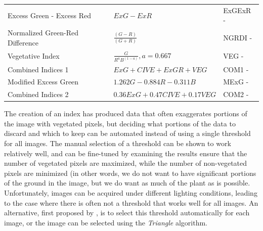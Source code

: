 \documentclass[letterpaper]{article}
\begin{document}
{{\begin{longtable}{x{\dimexpr.25\tabcolsep}
                  x{\dimexpr.35\tabcolsep}
                  x{\dimexpr.4\tabcolsep}}
			Excess Green - Excess Red   
			& $ExG - ExR$ 
			& ExGExR - \parencite{Neto2004-od}
	\tabularnewline\addlinespace
	
			Normalized Green-Red Difference    
			& $\frac {(G - R)} {(G + R)}$ 
			& NGRDI - \parencite{Hunt2005-tz}
	\tabularnewline\addlinespace
	
			Vegetative Index      
			& $\frac {G} {R^aB^{(1-a)}}, a = 0.667$ 
			& VEG - \parencite{Hague2006-da}
	\tabularnewline\addlinespace
	
			Combined Indices 1   
			& $ExG + CIVE + ExGR + VEG$ 
			& COM1 - \parencite{Guijarro2011-bl}
	\tabularnewline\addlinespace
	
			Modified Excess Green      
			& $1.262G - 0.884R - 0.311B$ 
			& MExG - \parencite{Burgos-Artizzu2011-od}
	\tabularnewline\addlinespace
	
			Combined Indices 2      
			& $0.36ExG + 0.47CIVE + 0.17VEG$ 
			&  COM2 - \parencite{Guerrero2012-zi}
	\label{table:segmentation}
\end{longtable}
}


The creation of an index has produced data that often exaggerates portions of the image with vegetated pixels, but deciding what portions of the data to discard and which to keep can be automated instead of using a single threshold for all images. The manual selection of a threshold can be shown to work relatively well, and can be fine-tuned by examining the results ensure that the number of vegetated pixels are maximized, while the number of non-vegetated pixels are minimized (in other words, we do not want to have significant portions of the ground in the image, but we do want as much of the plant as is possible. Unfortunately, images can be acquired under different lighting conditions, leading to the case where there is often not a threshold that works well for all images. An alternative, first proposed by \citeauthor*{Otsu1979-io}  \parencite{Otsu1979-io}, is to select this threshold automatically for each image, or the image can be selected using the \textit{Triangle} algorithm.

}
\end{document}

